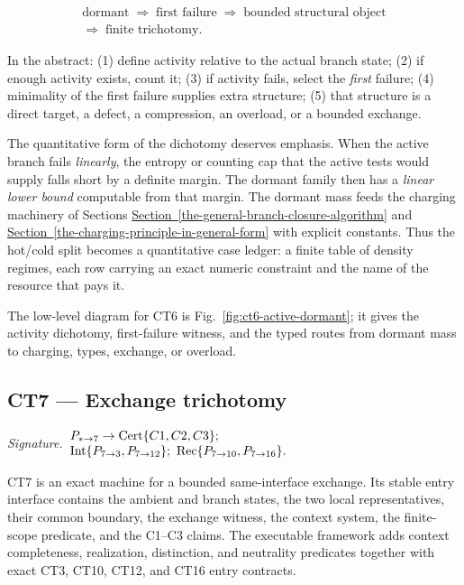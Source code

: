 \documentclass[
  11pt,
]{article}
\theoremstyle{definition}
\newcommand{\secref}[1]{\hyperref[#1]{Section~\ref*{#1}}}
\newcommand{\ctsignature}[1]{\par\noindent\emph{Signature.}\ #1\par\medskip}
\newcommand{\ctcert}[1]{\mathrm{Cert}\{#1\}}
\newcommand{\ctint}[1]{\mathrm{Int}\{#1\}}
\newcommand{\ctrec}[1]{\mathrm{Rec}\{#1\}}
\begin{document}
\[
\begin{gathered}
\text{dormant}
\;\Rightarrow\;
\text{first failure}
\;\Rightarrow\;
\text{bounded structural object}\\
\Rightarrow\;
\text{finite trichotomy}.
\end{gathered}
\]

In the abstract: (1) define activity relative to the actual branch
state; (2) if enough activity exists, count it; (3) if activity fails,
select the \emph{first} failure; (4) minimality of the first failure
supplies extra structure; (5) that structure is a direct target, a
defect, a compression, an overload, or a bounded exchange.

The quantitative form of the dichotomy deserves emphasis. When the
active branch fails \emph{linearly}, the entropy or counting cap that
the active tests would supply falls short by a definite margin. The
dormant family then has a \emph{linear lower bound} computable from that
margin. The dormant mass feeds the charging machinery of Sections \secref{the-general-branch-closure-algorithm} and
\secref{the-charging-principle-in-general-form} with explicit constants. Thus the hot/cold split becomes a
quantitative case ledger: a finite table of density regimes, each row
carrying an exact numeric constraint and the name of the resource that
pays it.

The low-level diagram for CT6 is Fig.~\ref{fig:ct6-active-dormant};
it gives the activity dichotomy, first-failure witness, and the typed
routes from dormant mass to charging, types, exchange, or overload.



\subsection{CT7 --- Exchange trichotomy}\label{ct:7}\label{the-exchange-trichotomy}
\ctsignature{\(\begin{array}{@{}l@{}}P_{\ast\to7}\to \ctcert{C1,C2,C3};\\ \ctint{P_{7\to3},P_{7\to12}};\ \ctrec{P_{7\to10},P_{7\to16}}.\end{array}\)}

CT7 is an exact machine for a bounded same-interface exchange.  Its stable
entry interface contains the ambient and branch states, the two local
representatives, their common boundary, the exchange witness, the context
system, the finite-scope predicate, and the C1--C3 claims.  The executable
framework adds context completeness, realization, distinction, and neutrality
predicates together with exact CT3, CT10, CT12, and CT16 entry contracts.
\end{document}
